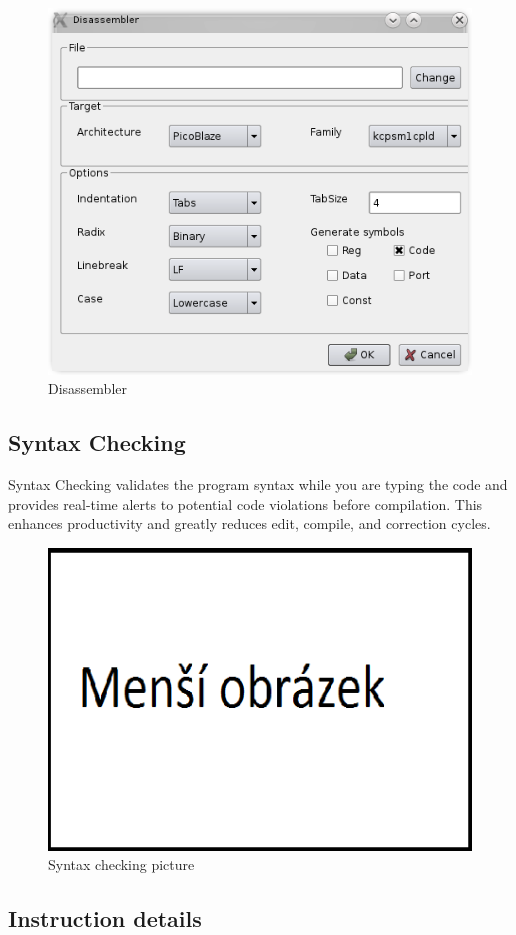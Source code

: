     \begin{figure}[h]
        \centering{}
        \includegraphics[width=.5\textwidth]{img/disassembler_window.png}
        \caption{Disassembler}
    \end{figure}

\subsection{Syntax Checking}
    Syntax Checking validates the program syntax while you are typing the code and provides real-time alerts to potential code violations before compilation. This enhances productivity and greatly reduces edit, compile, and correction cycles.
    \begin{figure}[h]
        \centering{}
        \includegraphics[scale=0.3]{img/mensi_obrazek.png}
        \caption{Syntax checking picture}
    \end{figure}

\subsection{Instruction details}

